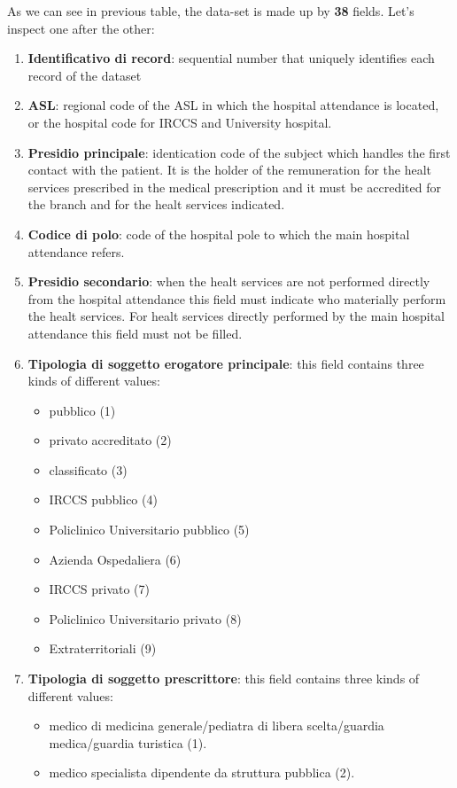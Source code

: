 \documentclass[paper=a4, fontsize=11pt]{scrartcl} %
\numberwithin{equation}{section} %
\numberwithin{figure}{section} %
\numberwithin{table}{section} %
\begin{document}
As we can see in previous table, the data-set is made up by \textbf{38} fields. Let's inspect one after the other:
\begin{enumerate}
\item \textbf{Identificativo di record}: sequential number that uniquely identifies each record of the dataset
\item \textbf{ASL}: regional code of the ASL in which the hospital attendance is located, or the hospital code for IRCCS and University hospital.
\item \textbf{Presidio principale}: identication code of the subject which handles the first contact with the patient. It is the holder of the remuneration for the healt services prescribed in the medical prescription and it must be accredited for the branch and for the healt services indicated.
\item \textbf{Codice di polo}: code of the hospital pole to which the main hospital attendance refers.
\item \textbf{Presidio secondario}: when the healt services are not performed directly from the hospital attendance this field must indicate who materially perform the healt services. For healt services directly performed by the main hospital attendance this field must not be filled.
\item \textbf{Tipologia di soggetto erogatore principale}: this field contains three kinds of different values:
\begin{itemize}
\item pubblico (1)
\item privato accreditato (2)
\item classificato (3)
\item IRCCS pubblico (4)
\item Policlinico Universitario pubblico (5)
\item Azienda Ospedaliera (6)
\item IRCCS privato (7)
\item Policlinico Universitario privato (8)
\item Extraterritoriali (9)
\end{itemize}
\item \textbf{Tipologia di soggetto prescrittore}: this field contains three kinds of different values:
\begin{itemize}
\item medico di medicina generale/pediatra di libera scelta/guardia medica/guardia turistica (1).
\item medico specialista dipendente da struttura pubblica (2).

\end{itemize}
\end{enumerate}
\end{document}
